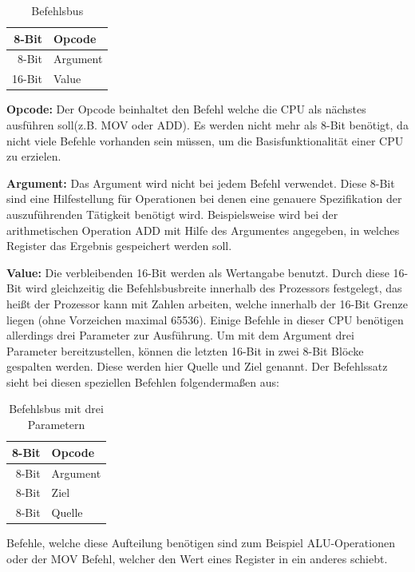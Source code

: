 \documentclass[12pt]{article}
\begin{document}
\begin{table}[!htb]
\centering
\label{Befehlsbus}
\begin{tabular}{|r|l|}
  \hline
  8-Bit & Opcode \\
  \hline
  8-Bit & Argument \\ 
  \hline
  16-Bit & Value\\
  \hline
  
\end{tabular}
\caption{Befehlsbus}
\end{table}
\par\bigskip\noindent\textbf{Opcode: } Der Opcode beinhaltet den Befehl welche die CPU als nächstes ausführen soll(z.B. MOV oder ADD). Es werden nicht mehr als 8-Bit benötigt, da nicht viele Befehle vorhanden sein müssen, um die Basisfunktionalität einer CPU zu erzielen.
\par\bigskip\noindent\textbf{Argument: } Das Argument wird nicht bei jedem Befehl verwendet. Diese 8-Bit sind eine Hilfestellung für Operationen bei denen eine genauere Spezifikation der auszuführenden Tätigkeit benötigt wird. Beispielsweise wird bei der arithmetischen Operation ADD mit Hilfe des Argumentes angegeben, in welches Register das Ergebnis gespeichert werden soll.
\par\bigskip\noindent\textbf{Value: } Die verbleibenden 16-Bit werden als Wertangabe benutzt. Durch diese 16-Bit wird gleichzeitig die Befehlsbusbreite innerhalb des Prozessors festgelegt, das heißt der Prozessor kann mit Zahlen arbeiten, welche innerhalb der 16-Bit Grenze liegen (ohne Vorzeichen maximal 65536). Einige Befehle in dieser CPU benötigen allerdings drei Parameter zur Ausführung. Um mit dem Argument drei Parameter bereitzustellen, können die letzten 16-Bit in zwei 8-Bit Blöcke gespalten werden. Diese werden hier Quelle und Ziel genannt. Der Befehlssatz sieht bei diesen speziellen Befehlen folgendermaßen aus: 
\begin{table}[!htb]
\centering
\begin{tabular}{|r|l|}
  \hline
  8-Bit & Opcode \\
  \hline
  8-Bit & Argument \\ 
  \hline
  8-Bit & Ziel\\
  \hline
  8-Bit & Quelle\\
  \hline
\end{tabular}
\caption{Befehlsbus mit drei Parametern}
\label{Befehlsbus3P}
\end{table}
\newline
Befehle, welche diese Aufteilung benötigen sind zum Beispiel ALU-Operationen oder der MOV Befehl, welcher den Wert eines Register in ein anderes schiebt.
\end{document}

